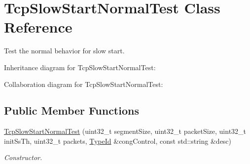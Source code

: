 \hypertarget{classTcpSlowStartNormalTest}{}\section{Tcp\+Slow\+Start\+Normal\+Test Class Reference}
\label{classTcpSlowStartNormalTest}


Test the normal behavior for slow start.  




Inheritance diagram for Tcp\+Slow\+Start\+Normal\+Test\+:


Collaboration diagram for Tcp\+Slow\+Start\+Normal\+Test\+:
\subsection*{Public Member Functions}
\begin{DoxyCompactItemize}
\item 
\hyperlink{classTcpSlowStartNormalTest_af65a18cca1b5d5a6c24586c2b4a814f8}{Tcp\+Slow\+Start\+Normal\+Test} (uint32\+\_\+t segment\+Size, uint32\+\_\+t packet\+Size, uint32\+\_\+t init\+Ss\+Th, uint32\+\_\+t packets, \hyperlink{classns3_1_1TypeId}{Type\+Id} \&cong\+Control, const std\+::string \&desc)
\begin{DoxyCompactList}\small\item\em Constructor. \end{DoxyCompactList}\end{DoxyCompactItemize}
